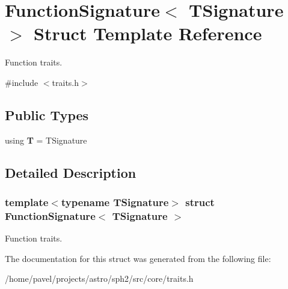 \hypertarget{structFunctionSignature}{}\section{Function\+Signature$<$ T\+Signature $>$ Struct Template Reference}
\label{structFunctionSignature}


Function traits.  




{\ttfamily \#include $<$traits.\+h$>$}

\subsection*{Public Types}
\begin{DoxyCompactItemize}
\item 
\hypertarget{structFunctionSignature_a06bbb69f569c95ae9adf739de896bc87}{}\label{structFunctionSignature_a06bbb69f569c95ae9adf739de896bc87} 
using {\bfseries T} = T\+Signature
\end{DoxyCompactItemize}


\subsection{Detailed Description}
\subsubsection*{template$<$typename T\+Signature$>$\newline
struct Function\+Signature$<$ T\+Signature $>$}

Function traits. 

The documentation for this struct was generated from the following file\+:\begin{DoxyCompactItemize}
\item 
/home/pavel/projects/astro/sph2/src/core/traits.\+h\end{DoxyCompactItemize}
